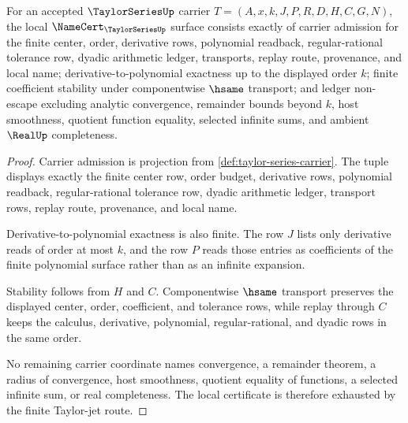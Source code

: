 \begin{theorem}
\label{thm:taylor-series-namecert-obligations}
For an accepted $\TaylorSeriesUp$ carrier $T=(A,x,k,J,P,R,D,H,C,G,N)$, the local $\NameCert_{\TaylorSeriesUp}$ surface consists exactly of carrier admission for the finite center, order, derivative rows, polynomial readback, regular-rational tolerance row, dyadic arithmetic ledger, transports, replay route, provenance, and local name; derivative-to-polynomial exactness up to the displayed order $k$; finite coefficient stability under componentwise $\hsame$ transport; and ledger non-escape excluding analytic convergence, remainder bounds beyond $k$, host smoothness, quotient function equality, selected infinite sums, and ambient $\RealUp$ completeness.
\end{theorem}
\begin{proof}
Carrier admission is projection from \autoref{def:taylor-series-carrier}. The tuple displays exactly the finite center row, order budget, derivative rows, polynomial readback, regular-rational tolerance row, dyadic arithmetic ledger, transport rows, replay route, provenance, and local name.

Derivative-to-polynomial exactness is also finite. The row $J$ lists only derivative reads of order at most $k$, and the row $P$ reads those entries as coefficients of the finite polynomial surface rather than as an infinite expansion.

Stability follows from $H$ and $C$. Componentwise $\hsame$ transport preserves the displayed center, order, coefficient, and tolerance rows, while replay through $C$ keeps the calculus, derivative, polynomial, regular-rational, and dyadic rows in the same order.

No remaining carrier coordinate names convergence, a remainder theorem, a radius of convergence, host smoothness, quotient equality of functions, a selected infinite sum, or real completeness. The local certificate is therefore exhausted by the finite Taylor-jet route.
\end{proof}

